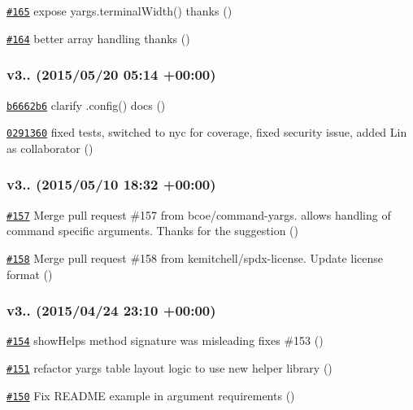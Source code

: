 \begin{DoxyItemize}
\item \href{https://github.com/bcoe/yargs/pull/165}{\tt \#165} expose yargs.\+terminal\+Width() thanks  ()
\item \href{https://github.com/bcoe/yargs/pull/164}{\tt \#164} better array handling thanks  ()
\end{DoxyItemize}

\subsubsection*{v3.. (2015/05/20 05\+:14 +00\+:00)}


\begin{DoxyItemize}
\item \href{https://github.com/bcoe/yargs/commit/b6662b6774cfeab4876f41ec5e2f67b7698f4e2f}{\tt b6662b6} clarify .config() docs ()
\item \href{https://github.com/bcoe/yargs/commit/02913606285ce31ce81d7f12c48d8a3029776ec7}{\tt 0291360} fixed tests, switched to nyc for coverage, fixed security issue, added Lin as collaborator ()
\end{DoxyItemize}

\subsubsection*{v3.. (2015/05/10 18\+:32 +00\+:00)}


\begin{DoxyItemize}
\item \href{https://github.com/bcoe/yargs/pull/157}{\tt \#157} Merge pull request \#157 from bcoe/command-\/yargs. allows handling of command specific arguments. Thanks for the suggestion  ()
\item \href{https://github.com/bcoe/yargs/pull/158}{\tt \#158} Merge pull request \#158 from kemitchell/spdx-\/license. Update license format ()
\end{DoxyItemize}

\subsubsection*{v3.. (2015/04/24 23\+:10 +00\+:00)}


\begin{DoxyItemize}
\item \href{https://github.com/bcoe/yargs/pull/154}{\tt \#154} show\+Help\textquotesingle{}s method signature was misleading fixes \#153 ()
\item \href{https://github.com/bcoe/yargs/pull/151}{\tt \#151} refactor yargs\textquotesingle{} table layout logic to use new helper library ()
\item \href{https://github.com/bcoe/yargs/pull/150}{\tt \#150} Fix R\+E\+A\+D\+ME example in argument requirements ()
\end{DoxyItemize}

